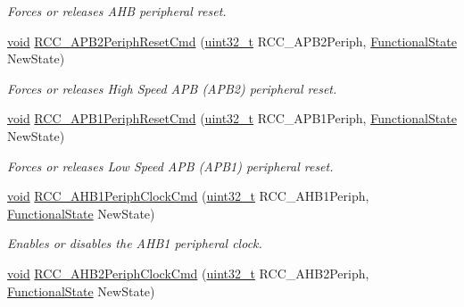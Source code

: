 \begin{DoxyCompactItemize}
\begin{DoxyCompactList}\small\item\em Forces or releases A\-H\-B peripheral reset. \end{DoxyCompactList}\item 
\hyperlink{group___n_a_m_e_ga18028b8badbf1ea7e704ccac3c488e82}{void} \hyperlink{group___r_c_c___group3_gad94553850ac07106a27ee85fec37efdf}{R\-C\-C\-\_\-\-A\-P\-B2\-Periph\-Reset\-Cmd} (\hyperlink{stdint_8h_a435d1572bf3f880d55459d9805097f62}{uint32\-\_\-t} R\-C\-C\-\_\-\-A\-P\-B2\-Periph, \hyperlink{group___exported__types_gac9a7e9a35d2513ec15c3b537aaa4fba1}{Functional\-State} New\-State)
\begin{DoxyCompactList}\small\item\em Forces or releases High Speed A\-P\-B (A\-P\-B2) peripheral reset. \end{DoxyCompactList}\item 
\hyperlink{group___n_a_m_e_ga18028b8badbf1ea7e704ccac3c488e82}{void} \hyperlink{group___r_c_c___group3_gab197ae4369c10b92640a733b40ed2801}{R\-C\-C\-\_\-\-A\-P\-B1\-Periph\-Reset\-Cmd} (\hyperlink{stdint_8h_a435d1572bf3f880d55459d9805097f62}{uint32\-\_\-t} R\-C\-C\-\_\-\-A\-P\-B1\-Periph, \hyperlink{group___exported__types_gac9a7e9a35d2513ec15c3b537aaa4fba1}{Functional\-State} New\-State)
\begin{DoxyCompactList}\small\item\em Forces or releases Low Speed A\-P\-B (A\-P\-B1) peripheral reset. \end{DoxyCompactList}\item 
\hyperlink{group___n_a_m_e_ga18028b8badbf1ea7e704ccac3c488e82}{void} \hyperlink{group___r_c_c___group3_ga80c89116820d48bb38db2e7d5e5a49b9}{R\-C\-C\-\_\-\-A\-H\-B1\-Periph\-Clock\-Cmd} (\hyperlink{stdint_8h_a435d1572bf3f880d55459d9805097f62}{uint32\-\_\-t} R\-C\-C\-\_\-\-A\-H\-B1\-Periph, \hyperlink{group___exported__types_gac9a7e9a35d2513ec15c3b537aaa4fba1}{Functional\-State} New\-State)
\begin{DoxyCompactList}\small\item\em Enables or disables the A\-H\-B1 peripheral clock. \end{DoxyCompactList}\item 
\hyperlink{group___n_a_m_e_ga18028b8badbf1ea7e704ccac3c488e82}{void} \hyperlink{group___r_c_c___group3_gaadffedbd87e796f01d9776b8ee01ff5e}{R\-C\-C\-\_\-\-A\-H\-B2\-Periph\-Clock\-Cmd} (\hyperlink{stdint_8h_a435d1572bf3f880d55459d9805097f62}{uint32\-\_\-t} R\-C\-C\-\_\-\-A\-H\-B2\-Periph, \hyperlink{group___exported__types_gac9a7e9a35d2513ec15c3b537aaa4fba1}{Functional\-State} New\-State)

\end{DoxyCompactItemize}
